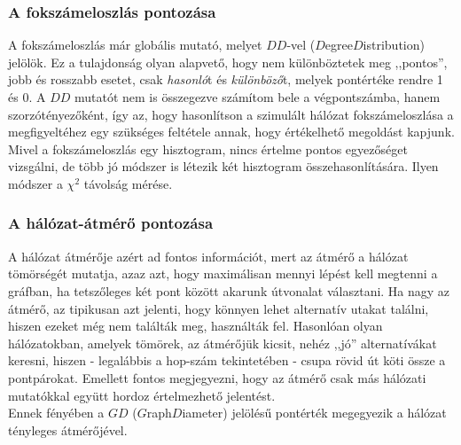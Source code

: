     \subsubsection{A fokszámeloszlás pontozása}
    A fokszámeloszlás már globális mutató, melyet $DD$-vel ($D$egree$D$istribution) jelölök. Ez a tulajdonság olyan alapvető, hogy nem különböztetek meg ,,pontos'', jobb és rosszabb esetet, csak \textit{hasonló}t és \textit{különböző}t, melyek pontértéke rendre 1 és 0. A $DD$ mutatót nem is összegezve számítom bele a végpontszámba, hanem szorzótényezőként, így az, hogy hasonlítson a szimulált hálózat fokszámeloszlása a megfigyeltéhez egy szükséges feltétele annak, hogy értékelhető megoldást kapjunk.\\

    Mivel a fokszámeloszlás egy hisztogram, nincs értelme pontos egyezőséget vizsgálni, de több jó módszer is létezik két hisztogram összehasonlítására. Ilyen módszer a $\chi^2$ távolság mérése. 

    \subsubsection{A hálózat-átmérő pontozása}
    A hálózat átmérője azért ad fontos információt, mert az átmérő a hálózat tömörségét mutatja, azaz azt, hogy maximálisan mennyi lépést kell megtenni a gráfban, ha tetszőleges két pont között akarunk útvonalat választani. Ha nagy az átmérő, az tipikusan azt jelenti, hogy könnyen lehet alternatív utakat találni, hiszen ezeket még nem találták meg, használták fel. Hasonlóan olyan hálózatokban, amelyek tömörek, az átmérőjük kicsit, nehéz ,,jó'' alternatívákat keresni, hiszen - legalábbis a hop-szám tekintetében - csupa rövid út köti össze a pontpárokat. Emellett fontos megjegyezni, hogy az átmérő csak más hálózati mutatókkal együtt hordoz értelmezhető jelentést.\\
    Ennek fényében a $GD$ ($G$raph$D$iameter) jelölésű pontérték megegyezik a hálózat tényleges átmérőjével.

